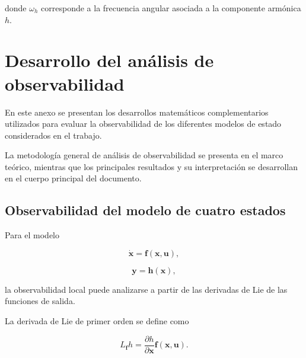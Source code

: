 donde $\omega_h$ corresponde a la frecuencia angular asociada a la
componente armónica $h$.

%
%

\clearpage



\chapter{Desarrollo del análisis de observabilidad}
\label{anexo:observabilidad}

En este anexo se presentan los desarrollos matemáticos complementarios
utilizados para evaluar la observabilidad de los diferentes modelos
de estado considerados en el trabajo.

La metodología general de análisis de observabilidad se presenta en
el marco teórico, mientras que los principales resultados y su
interpretación se desarrollan en el cuerpo principal del documento.


\section{Observabilidad del modelo de cuatro estados}
\label{anexo:observabilidad_4}

Para el modelo

\begin{equation}
    \dot{\mathbf{x}} =
    \mathbf{f}(\mathbf{x},\mathbf{u}),
\end{equation}

\begin{equation}
    \mathbf{y} =
    \mathbf{h}(\mathbf{x}),
\end{equation}

la observabilidad local puede analizarse a partir de las derivadas de
Lie de las funciones de salida.

La derivada de Lie de primer orden se define como

\begin{equation}
    L_{\mathbf{f}}h =
    \frac{\partial h}{\partial \mathbf{x}}
    \mathbf{f}(\mathbf{x},\mathbf{u}).
\end{equation}

